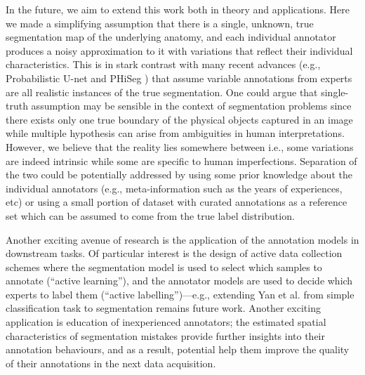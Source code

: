 In the future, we aim to extend this work both in theory and applications. Here we made a simplifying assumption that there is a single, unknown, true segmentation map of the underlying anatomy, and each individual annotator produces a noisy approximation to it with variations that reflect their individual characteristics. This is in stark contrast with many recent advances (e.g., Probabilistic U-net \cite{kohl2018probabilistic} and PHiSeg \cite{baumgartner2019phiseg}) that assume variable annotations from experts are all realistic instances of the true segmentation. One could argue that single-truth assumption may be sensible in the context of segmentation problems since there exists only one true boundary of the physical objects captured in an image while multiple hypothesis can arise from ambiguities in human interpretations. However, we believe that the reality lies somewhere between i.e., some variations are indeed intrinsic while some are specific to human imperfections. Separation of the two could be potentially addressed by using some prior knowledge about the individual annotators (e.g., meta-information such as the years of experiences, etc) \cite{raykar2009supervised} or using a small portion of dataset with curated annotations as a reference set which can be assumed to come from the true label distribution. 

Another exciting avenue of research is the application of the annotation models in downstream tasks. Of particular interest is the design of active data collection schemes where the segmentation model is used to select which samples to annotate (``active learning''), and the annotator models are used to decide which experts to label them (``active labelling'')---e.g., extending Yan et al. \cite{yan2011active} from simple classification task to segmentation remains future work. Another exciting application is education of inexperienced annotators; the estimated spatial characteristics of segmentation mistakes provide further insights into their annotation behaviours, and as a result, potential help them improve the quality of their annotations in the next data acquisition. 


% 

